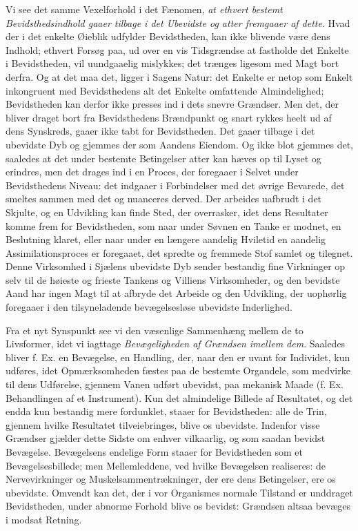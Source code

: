 \documentclass[12pt,a4paper,openany]{book}
\newcommand{\opage}[1]{\marginnote{\footnotesize\textit{[#1]}}}
\begin{document}
\opage{48}Vi see det samme Vexelforhold i det Fænomen,
\emph{at ethvert
bestemt Bevidsthedsindhold gaaer tilbage i
det Ubevidste og atter fremgaaer af dette}. Hvad
der i det enkelte Øieblik udfylder Bevidstheden, kan ikke blivende
være dens Indhold; ethvert Forsøg paa, ud over en vis Tidsgrændse
at fastholde det Enkelte i Bevidstheden, vil uundgaaelig
mislykkes; det trænges ligesom med Magt bort derfra.
Og at det maa det, ligger i Sagens Natur: det Enkelte er
netop som Enkelt inkongruent med Bevidsthedens alt det
Enkelte omfattende Almindelighed; Bevidstheden kan derfor
ikke presses ind i dets snevre Grændser. Men det, der
bliver draget bort fra Bevidsthedens Brændpunkt og snart
rykkes heelt ud af dens Synskreds, gaaer ikke tabt for
Bevidstheden. Det gaaer tilbage i det ubevidste Dyb og
gjemmes der som Aandens Eiendom. Og ikke blot gjemmes
det, saaledes at det under bestemte Betingelser atter kan
hæves op til Lyset og erindres, men det drages ind i en
Proces, der foregaaer i Selvet under Bevidsthedens Niveau:
det indgaaer i Forbindelser med det øvrige Bevarede, det
smeltes sammen med det og nuanceres derved. Der arbeides
uafbrudt i det Skjulte, og en Udvikling kan finde Sted,
der overrasker, idet dens Resultater komme frem for Bevidstheden,
som naar under Søvnen en Tanke er modnet, en
Beslutning klaret, eller naar under en længere aandelig
Hviletid en aandelig Assimilationsproces er foregaaet, det
spredte og fremmede Stof samlet og tilegnet. Denne Virksomhed
i Sjælens ubevidste Dyb sender bestandig fine Virkninger
op selv til de høieste og frieste Tankens og Villiens
Virksomheder, og den bevidste Aand har ingen Magt til
at afbryde det Arbeide og den Udvikling, der uophørlig
foregaaer i den tilsyneladende bevægelsesløse ubevidste Inderlighed.

Fra et nyt Synspunkt see vi den væsenlige Sammenhæng
mellem de to Livsformer, idet vi iagttage \emph{Bevægeligheden
af Grændsen imellem dem}. Saaledes bliver
f. Ex. en Bevægelse, en Handling, der, naar den er uvant for
\opage{49}Individet, kun udføres, idet Opmærksomheden fæstes paa de
bestemte Organdele, som medvirke til dens Udførelse, gjennem
Vanen udført ubevidst, paa mekanisk Maade (f. Ex. Behandlingen
af et Instrument). Kun det almindelige Billede af
Resultatet, og det endda kun bestandig mere fordunklet,
staaer for Bevidstheden: alle de Trin, gjennem hvilke Resultatet
tilveiebringes, blive os ubevidste. Indenfor visse Grændser
gjælder dette Sidste om enhver vilkaarlig, og som saadan bevidst
Bevægelse. Bevægelsens endelige Form staaer for Bevidstheden
som et Bevægelsesbillede; men Mellemleddene, ved
hvilke Bevægelsen realiseres: de Nervevirkninger og Muskelsammentrækninger,
der ere dens Betingelser, ere os ubevidste.
Omvendt kan det, der i vor Organismes normale Tilstand
er unddraget Bevidstheden, under abnorme Forhold blive os
bevidst: Grændsen altsaa bevæges i modsat Retning.
\end{document}
